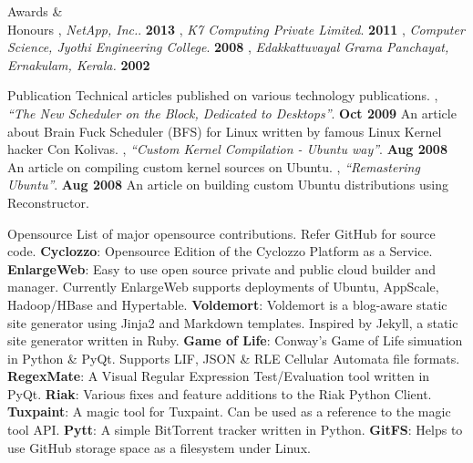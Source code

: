 \documentclass{resume}
\begin{document}

\begin{category}{Awards \&\\ Honours}
  , {\em NetApp, Inc.}. \hfill \textbf{2013}
  , {\em K7 Computing Private Limited}. \hfill \textbf{2011}
  , {\em Computer Science, Jyothi Engineering College}. \hfill \textbf{2008}
  , {\em Edakkattuvayal Grama Panchayat, Ernakulam, Kerala.} \hfill \textbf{2002}
\end{category}


\begin{category}{Publication}
  \citemnobullet Technical articles published on various technology publications.
  , {\em ``The New Scheduler on the Block, Dedicated to Desktops''}. \hfill \textbf{Oct 2009}
  \citemnobullet An article about Brain Fuck Scheduler (BFS) for Linux written by famous Linux Kernel hacker Con Kolivas.
  , {\em ``Custom Kernel Compilation - Ubuntu way''}. \hfill \textbf{Aug 2008}
  \citemnobullet An article on compiling custom kernel sources on Ubuntu.
  , {\em ``Remastering Ubuntu''}. \hfill \textbf{Aug 2008}
  \citemnobullet An article on building custom Ubuntu distributions using Reconstructor.
\end{category}


\begin{category}{Opensource}
  \citemnobullet List of major opensource contributions. Refer GitHub for source code.
  \citembullet \textbf{Cyclozzo}: Opensource Edition of the Cyclozzo Platform as a Service.
  \citembullet \textbf{EnlargeWeb}: Easy to use open source private and public cloud builder and manager. 
  Currently EnlargeWeb supports deployments of Ubuntu, AppScale, Hadoop/HBase and Hypertable.
  \citembullet \textbf{Voldemort}: Voldemort is a blog-aware static site generator using Jinja2 
  and Markdown templates. Inspired by Jekyll, a static site generator written in Ruby.
  \citembullet \textbf{Game of Life}: Conway's Game of Life simuation in Python \& PyQt. Supports LIF, JSON \&
  RLE Cellular Automata file formats.
  \citembullet \textbf{RegexMate}: A Visual Regular Expression Test/Evaluation tool written in PyQt.
  \citembullet \textbf{Riak}: Various fixes and feature additions to the Riak Python Client.
  \citembullet \textbf{Tuxpaint}: A magic tool for Tuxpaint. Can be used as a reference to the magic tool API.
  \citembullet \textbf{Pytt}: A simple BitTorrent tracker written in Python.
  \citembullet \textbf{GitFS}: Helps to use GitHub storage space as a filesystem under Linux.
\end{category}
\end{document}
